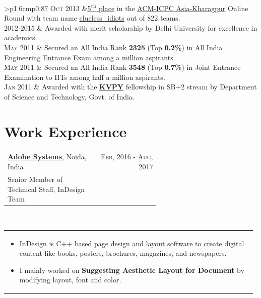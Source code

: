 \documentclass[a4paper]{article} %
\newcommand{\verticalspacing}{-0.25cm}
\newcommand{\bulletspace}{0.7cm}
\newcommand{\projectheadspacing}{6.9cm}
\newcommand{\cproject}[5]{%
    \begin{tabular}{p{0.60\linewidth}r}
        \textcolor{smokyblack}{\small #2} & \multicolumn{1}{m{ \projectheadspacing{} }}{\raggedleft \small {\textsc{#1}}}\\
        \textcolor{payne\'sgrey}{\small #3} & \small {#4}
    \end{tabular}\\
    \begin{tabular}{p{0.98\linewidth}}
    \vspace{-0.3cm}
        \small{#5}
    \end{tabular}
    \vspace{\verticalspacing{}}
}
\newcommand{\itemlist}[1]{%
    \def\arraystretch{1.2}
    \begin{tabular}{>{\raggedleft}p{1.6cm}p{0.87\linewidth}}
        #1
    \end{tabular}
    \def\arraystretch{1.0}
}
\begin{document}
\itemlist {%
    \textsc{\small Oct 2013} 		&\href{https://www.codechef.com/rankings/ACMKGP13} {5\textsuperscript{th} place} in the \href{https://www.codechef.com/ACMKGP13} {ACM-ICPC Asia-Kharagpur} Online Round with team name \href{https://www.codechef.com/teams/view/acmkg13tm154} {clueless\_idiots}  out of 822 teams.\\
    \textsc{\small 2012-2015}  	& Awarded with merit scholarship by Delhi University for excellence in academics.\\
	\textsc{\small May 2011}		& Secured an All India Rank \textbf{2325} (Top \textbf{0.2\%}) in All India Engineering Entrance Exam among a million aspirants.\\
    \textsc{\small May 2011}		& Secured an All India Rank \textbf{3548} (Top \textbf{0.7\%}) in Joint Entrance Examination to IITs among half a million aspirants.\\
	\textsc{\small Jan 2011}		& Awarded with the \href{http://www.kvpy.iisc.ernet.in/main/index.htm}{\textbf{KVPY}} fellowship in SB+2 stream by Department of Science and Technology, Govt. of India.\\
}


%
\section{Work Experience}
\cproject
      {Feb, 2016 - Aug, 2017}
      {\href{http://www.adobe.com/}{\textbf{Adobe Systems}}, Noida, India}
      {Senior Member of Technical Staff, InDesign Team}
      {}%
      {%
          \begin{itemize}[leftmargin=\bulletspace{}]
              \item InDesign is C++ based page design and layout software to create digital content like books, posters,  brochures, magazines, and newspapers.
              \item I mainly worked on \textbf{Suggesting Aesthetic Layout for Document} by modifying layout, font and color.
          \end{itemize}
     }
     
\end{document}
